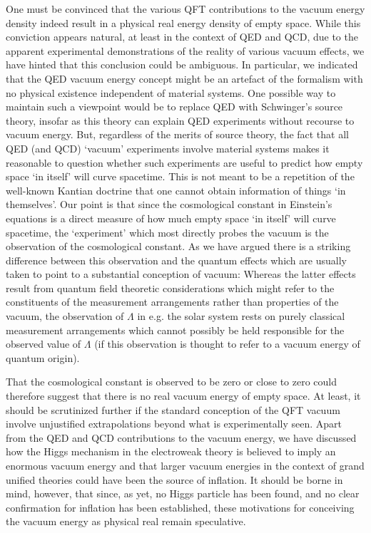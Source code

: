 \documentclass[12pt]{article}
\begin{document}
\noindent One must be convinced that the various QFT contributions
to the vacuum energy density indeed result in a physical real
energy density of empty space. While this conviction appears
natural, at least in the context of QED and QCD, due to the
apparent experimental demonstrations of the reality of various
vacuum effects, we have hinted that this conclusion could be
ambiguous. In particular, we indicated that the QED vacuum energy
concept might be an artefact of the formalism with no physical
existence independent of material systems. One possible way to
maintain such a viewpoint would be to replace QED with Schwinger's
source theory, insofar as this theory can explain QED experiments
without recourse to vacuum energy. But, regardless of the merits of
source theory, the fact that all QED (and QCD) `vacuum'
experiments involve material systems makes it reasonable to
question whether such experiments are useful to predict how empty
space `in itself' will curve spacetime. This is not meant to be a
repetition of the well-known Kantian doctrine that one cannot
obtain information of things `in themselves'. Our point is that
since the cosmological constant in Einstein's equations is a direct
measure of how much empty space `in itself' will curve spacetime,
the `experiment' which most directly probes the vacuum is the
observation of the cosmological constant. As we have argued there
is a striking difference between this observation and the quantum
effects which are usually taken to point to a substantial conception
of vacuum: Whereas the latter effects result from quantum field
theoretic considerations which might refer to the
constituents of the measurement arrangements rather than
properties of the vacuum, the observation of $\Lambda$ in e.g. the
solar system rests on purely classical measurement arrangements
which cannot possibly be held responsible for the observed value
of $\Lambda$ (if this observation is thought to refer to a vacuum
energy of quantum origin).

That the cosmological constant is observed to be zero or close to zero
could therefore suggest that there is no real vacuum energy of empty
space. At least, it should be scrutinized further if the standard
conception of the QFT vacuum involve unjustified extrapolations beyond
what is experimentally seen.  Apart from the QED and QCD contributions
to the vacuum energy, we have discussed how the Higgs mechanism in the
electroweak theory is believed to imply an enormous vacuum energy and
that larger vacuum energies in the context of grand unified theories
could have been the source of inflation.  It should be borne in mind,
however, that since, as yet, no Higgs particle has been found, and no
clear confirmation for inflation has been established, these
motivations for conceiving the vacuum energy as physical real remain
speculative.\\
\end{document}
